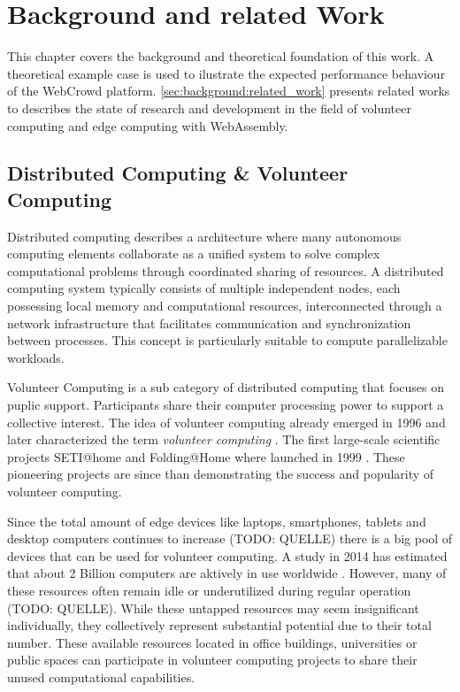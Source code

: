 \chapter{Background and related Work}
\label{ch:background}
This chapter covers the background and theoretical foundation of this work. A theoretical example case is used to ilustrate the expected performance behaviour of the WebCrowd platform. \autoref{sec:background:related_work} presents related works to describes the state of research and development in the field of volunteer computing and edge computing with WebAssembly.

\section{Distributed Computing \& Volunteer Computing}
Distributed computing describes a architecture where many autonomous computing elements collaborate as a unified system to solve complex computational problems through coordinated sharing of resources. A distributed computing system typically consists of multiple independent nodes, each possessing local memory and computational resources, interconnected through a network infrastructure that facilitates communication and synchronization between processes. This concept is particularly suitable to compute parallelizable workloads.

Volunteer Computing is a sub category of distributed computing that focuses on puplic support. Participants share their computer processing power to support a collective interest. The idea of volunteer computing already emerged in 1996 \cite{relatedwork:boinc1} and \citeauthor{background:vcname} later characterized the term \emph{volunteer computing} \cite{background:vcname}. The first large-scale scientific projects SETI@home and Folding@Home where launched in 1999 \cite{relatedwork:boinc1,relatedwork:seti}. These pioneering projects are since than demonstrating the success and popularity of volunteer computing.

Since the total amount of edge devices like laptops, smartphones, tablets and desktop computers continues to increase (TODO: QUELLE) there is a big pool of devices that can be used for volunteer computing. A study in 2014 has estimated that about 2 Billion computers are aktively in use worldwide \cite{intro:computersAmount,relatedwork:boinc1}. However, many of these resources often remain idle or underutilized during regular operation (TODO: QUELLE). While these untapped resources may seem insignificant individually, they collectively represent substantial potential due to their total number. These available resources located in office buildings, universities or public spaces can participate in volunteer computing projects to share their unused computational capabilities.

